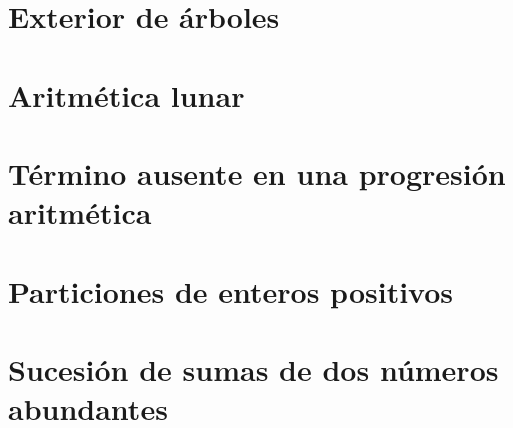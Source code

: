 \documentclass[a4paper,12pt,twoside]{book}
\begin{document}
\chapter{Exterior de árboles}
\label{190206}

\chapter{Aritmética lunar}
\label{190207}

\chapter{Término ausente en una progresión aritmética}
\label{190208}


\chapter{Particiones de enteros positivos}
\label{190211}

\chapter{Sucesión de sumas de dos números abundantes}
\label{190212}
\end{document}
